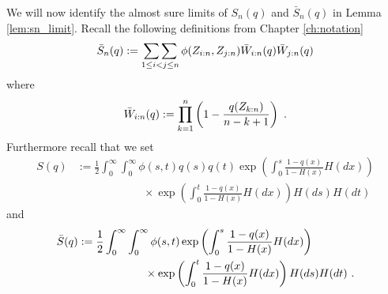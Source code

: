 %
%
We will now identify the almost sure limits of $S_n(q)$ and $\bar{S}_n(q)$ in Lemma \ref{lem:sn_limit}. Recall the following definitions from Chapter \ref{ch:notation}
$$\bar{S}_n(q) := \mathop{\sum\sum}\limits_{1\leq i < j \leq n} \phi(Z_{i:n},Z_{j:n}) \bar{W}_{i:n}(q) \bar{W}_{j:n}(q)$$
where 
$$\bar{W}_{i:n}(q) := \prod_{k=1}^{n}\left(1-\frac{q(Z_{k:n})}{n-k+1}\right)\textrm{ .}$$
Furthermore recall that we set
\begin{align*}
	S(q) &:= \frac{1}{2}\int_{0}^{\infty} \int_{0}^{\infty} \phi(s,t) q(s)q(t) \exp\left(\int_{0}^{s} \frac{1-q(x)}{1-H(x)} H(dx)\right)\\
	&\qquad\qquad\qquad \times \exp\left(\int_{0}^{t} \frac{1-q(x)}{1-H(x)} H(dx) \right)H(ds)H(dt)
\end{align*}
and 
\begin{align*}
	\bar{S}(q) &:= \frac{1}{2}\int_{0}^{\infty} \int_{0}^{\infty} \phi(s,t)  \exp\left(\int_{0}^{s} \frac{1-q(x)}{1-H(x)} H(dx)\right)\\
	&\qquad\qquad\qquad \times \exp\left(\int_{0}^{t} \frac{1-q(x)}{1-H(x)} H(dx) \right)H(ds)H(dt)\textrm{ .}
\end{align*}
\\

